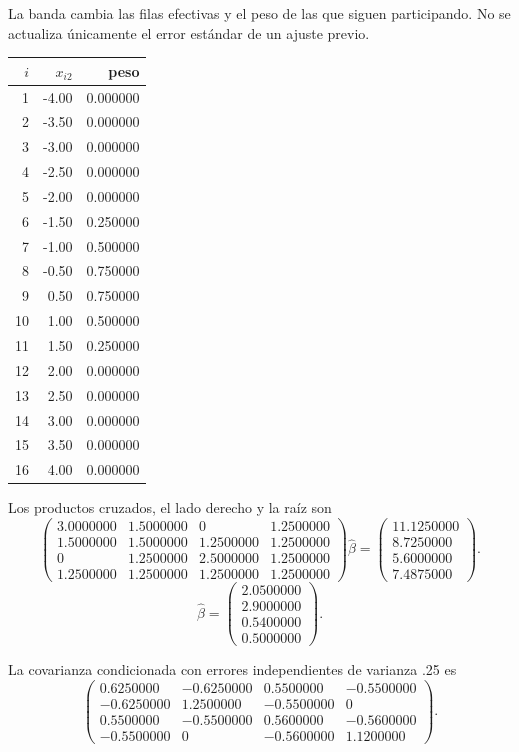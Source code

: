 \documentclass[11pt,a4paper]{article}
\begin{document}
La banda cambia las filas efectivas y
el peso de las que siguen participando.
No se actualiza únicamente el error estándar
de un ajuste previo.
\begin{center}\small\begin{tabular}{rrr}\toprule
\(i\)&\(x_{i2}\)&peso\\\midrule
1&-4.00&0.000000\\
2&-3.50&0.000000\\
3&-3.00&0.000000\\
4&-2.50&0.000000\\
5&-2.00&0.000000\\
6&-1.50&0.250000\\
7&-1.00&0.500000\\
8&-0.50&0.750000\\
9&0.50&0.750000\\
10&1.00&0.500000\\
11&1.50&0.250000\\
12&2.00&0.000000\\
13&2.50&0.000000\\
14&3.00&0.000000\\
15&3.50&0.000000\\
16&4.00&0.000000\\\bottomrule\end{tabular}\end{center}
Los productos cruzados, el lado derecho
y la raíz son
\[
\begin{pmatrix}3.0000000&1.5000000&0&1.2500000\\1.5000000&1.5000000&1.2500000&1.2500000\\0&1.2500000&2.5000000&1.2500000\\1.2500000&1.2500000&1.2500000&1.2500000\end{pmatrix}\widehat\beta=\begin{pmatrix}11.1250000\\8.7250000\\5.6000000\\7.4875000\end{pmatrix}.
\]
\[
\widehat\beta=\begin{pmatrix}2.0500000\\2.9000000\\0.5400000\\0.5000000\end{pmatrix}.
\]

La covarianza condicionada con errores
independientes de varianza .25 es
\[
\begin{pmatrix}0.6250000&-0.6250000&0.5500000&-0.5500000\\-0.6250000&1.2500000&-0.5500000&0\\0.5500000&-0.5500000&0.5600000&-0.5600000\\-0.5500000&0&-0.5600000&1.1200000\end{pmatrix}.
\]
\end{document}
